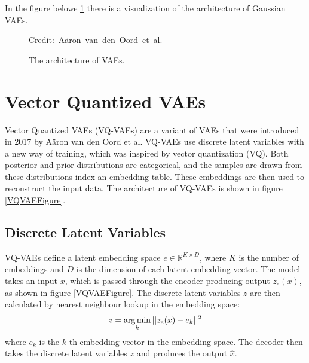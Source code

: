 In the figure belowe \ref{VAEFigure} there is a visualization of the architecture of Gaussian VAEs.


\begin{figure}[H]
    \centering

    \caption{ The architecture of VAEs.}
  	\medskip 
	\hspace*{15pt}\hbox{\scriptsize Credit: Aäron van den Oord et al.}
    \label{VAEFigure}
\end{figure}

\pagebreak

\section{Vector Quantized VAEs}

Vector Quantized VAEs (VQ-VAEs) are a variant of VAEs that were introduced in 2017 by Aäron van den Oord et al\cite{vqvae}. VQ-VAEs use discrete latent variables with a new way of training, which was inspired by vector quantization (VQ). Both posterior and prior distributions are categorical, and the samples are drawn from these distributions index an embedding table\cite{vqvae}. These embeddings are then used to reconstruct the input data. The architecture of VQ-VAEs is shown in figure \ref{VQVAEFigure}.

\subsection {Discrete Latent Variables}

VQ-VAEs define a latent embedding space $ e \in \mathbb{R}^{K \times D} $, where $K$ is the number of embeddings and $D$ is the dimension of each latent embedding vector. The model takes an input $x$, which is passed through the encoder producing output $z_e(x)$, as shown in figure \ref{VQVAEFigure}. 
The discrete latent variables $z$ are then calculated by nearest neighbour lookup in the embedding space: \[ z = \operatorname*{arg\,min}_{k} || z_e(x) - e_k ||^2 \] where $e_k$ is the $k$-th embedding vector in the embedding space. The decoder then takes the discrete latent variables $z$ and produces the output $\hat{x}$.

